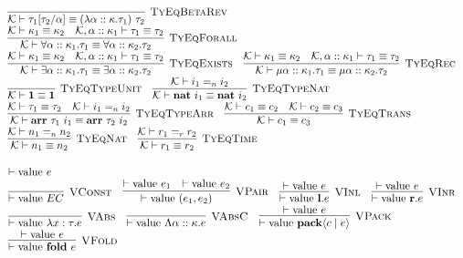 \documentclass[fleqn]{article}
\begin{document}
\[\begin{array}{l}
    \infer[\textsc{TyEqBetaRev}]{\mathcal{K} \vdash \tau_1[\tau_2/\alpha] \equiv (\lambda \alpha :: \kappa. \tau_1)~\tau_2}{} \\
    \infer[\textsc{TyEqForall}]{\mathcal{K} \vdash \forall \alpha :: \kappa_1. \tau_1 \equiv \forall \alpha :: \kappa_2. \tau_2}{\mathcal{K} \vdash \kappa_1 \equiv \kappa_2 & \mathcal{K},\alpha :: \kappa_1 \vdash \tau_1 \equiv \tau_2} \\
    \infer[\textsc{TyEqExists}]{\mathcal{K} \vdash \exists \alpha :: \kappa_1. \tau_1 \equiv \exists \alpha :: \kappa_2. \tau_2}{\mathcal{K} \vdash \kappa_1 \equiv \kappa_2 & \mathcal{K},\alpha :: \kappa_1 \vdash \tau_1 \equiv \tau_2} \hspace{1em}
    \infer[\textsc{TyEqRec}]{\mathcal{K} \vdash \mu \alpha :: \kappa_1. \tau_1 \equiv \mu \alpha :: \kappa_2. \tau_2}{\mathcal{K} \vdash \kappa_1 \equiv \kappa_2 & \mathcal{K},\alpha :: \kappa_1 \vdash \tau_1 \equiv \tau_2} \\
    \infer[\textsc{TyEqTypeUnit}]{\mathcal{K} \vdash \mathbf{1} \equiv \mathbf{1}}{} \hspace{1em}
    \infer[\textsc{TyEqTypeNat}]{\mathcal{K} \vdash \mathbf{nat}~i_1 \equiv \mathbf{nat}~i_2}{\mathcal{K} \vdash i_1 =_n i_2} \\
    \infer[\textsc{TyEqTypeArr}]{\mathcal{K} \vdash \mathbf{arr}~\tau_1~i_1 \equiv \mathbf{arr}~\tau_2~i_2}{\mathcal{K} \vdash \tau_1 \equiv \tau_2 & \mathcal{K} \vdash i_1 =_n i_2} \hspace{1em}
    \infer[\textsc{TyEqTrans}]{\mathcal{K} \vdash c_1 \equiv c_3}{\mathcal{K} \vdash c_1 \equiv c_2 & \mathcal{K} \vdash c_2 \equiv c_3} \\
    \infer[\textsc{TyEqNat}]{\mathcal{K} \vdash n_1 \equiv n_2}{\mathcal{K} \vdash n_1 =_n n_2} \hspace{1em}
    \infer[\textsc{TyEqTime}]{\mathcal{K} \vdash r_1 \equiv r_2}{\mathcal{K} \vdash r_1 =_r r_2}
\end{array}
\]

\[
\begin{array}{l}
    \vdash \mathrm{value}~e \\
    \infer[\textsc{VConst}]{\vdash \mathrm{value}~EC}{} \hspace{1em}
    \infer[\textsc{VPair}]{\vdash \mathrm{value}~(e_1,e_2)}{\vdash \mathrm{value}~e_1 & \vdash \mathrm{value}~e_2} \hspace{1em}
    \infer[\textsc{VInl}]{\vdash \mathrm{value}~\mathbf{l}.e}{\vdash \mathrm{value}~e} \hspace{1em}
    \infer[\textsc{VInr}]{\vdash \mathrm{value}~\mathbf{r}.e}{\vdash \mathrm{value}~e} \\
    \infer[\textsc{VAbs}]{\vdash \mathrm{value}~\lambda x : \tau.e}{} \hspace{1em}
    \infer[\textsc{VAbsC}]{\vdash \mathrm{value}~\Lambda \alpha :: \kappa.e}{} \hspace{1em}
    \infer[\textsc{VPack}]{\vdash \mathrm{value}~\mathbf{pack}\langle c \mid e \rangle}{\vdash \mathrm{value}~e} \\
    \infer[\textsc{VFold}]{\vdash \mathrm{value}~\mathbf{fold}~e}{\vdash \mathrm{value}~e}
\end{array}
\]
\end{document}
